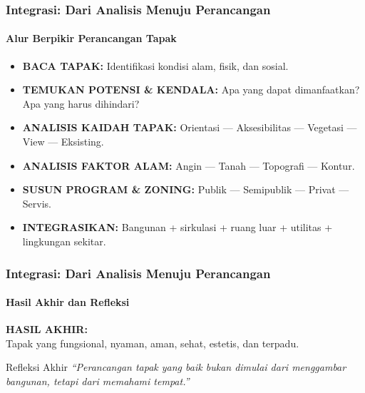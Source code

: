 \documentclass[../main.tex]{subfiles}
\begin{document}
\begin{frame}[mytitle=center, t, mycolor=digiPH_white, light]
	\frametitle{Integrasi: Dari Analisis Menuju Perancangan}
	\framesubtitle{Alur Berpikir Perancangan Tapak}

	\begin{itemize}
		\item \textbf{BACA TAPAK:} Identifikasi kondisi alam, fisik, dan sosial.
		\item \textbf{TEMUKAN POTENSI \& KENDALA:} Apa yang dapat dimanfaatkan? Apa yang harus dihindari?
		\item \textbf{ANALISIS KAIDAH TAPAK:} Orientasi — Aksesibilitas — Vegetasi — View — Eksisting.
		\item \textbf{ANALISIS FAKTOR ALAM:} Angin — Tanah — Topografi — Kontur.
		\item \textbf{SUSUN PROGRAM \& ZONING:} Publik — Semipublik — Privat — Servis.
		\item \textbf{INTEGRASIKAN:} Bangunan + sirkulasi + ruang luar + utilitas + lingkungan sekitar.
	\end{itemize}
\end{frame}

\begin{frame}[mytitle=standard, c, mycolor=digiPH_cream, light]
	\frametitle{Integrasi: Dari Analisis Menuju Perancangan}
	\framesubtitle{Hasil Akhir dan Refleksi}

	\textbf{HASIL AKHIR:} \\
	Tapak yang fungsional, nyaman, aman, sehat, estetis, dan terpadu.

	\vspace{0.8cm}
	\begin{alertblock}{Refleksi Akhir}
		\centering
		\textit{“Perancangan tapak yang baik bukan dimulai dari menggambar bangunan, tetapi dari memahami tempat.”}
	\end{alertblock}
\end{frame}
\end{document}
